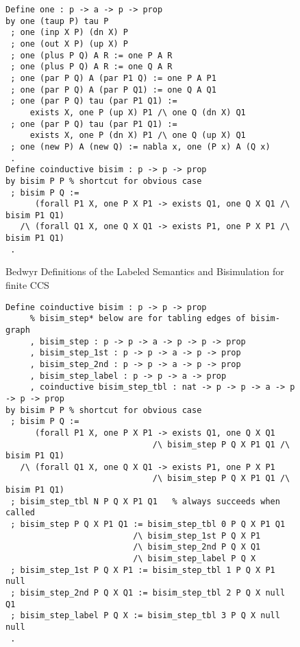 \documentclass{llncs}
\begin{document}
\begin{figure}
\begin{verbatim}
Define one : p -> a -> p -> prop
by one (taup P) tau P
 ; one (inp X P) (dn X) P
 ; one (out X P) (up X) P
 ; one (plus P Q) A R := one P A R
 ; one (plus P Q) A R := one Q A R
 ; one (par P Q) A (par P1 Q) := one P A P1
 ; one (par P Q) A (par P Q1) := one Q A Q1
 ; one (par P Q) tau (par P1 Q1) :=
     exists X, one P (up X) P1 /\ one Q (dn X) Q1
 ; one (par P Q) tau (par P1 Q1) :=
     exists X, one P (dn X) P1 /\ one Q (up X) Q1
 ; one (new P) A (new Q) := nabla x, one (P x) A (Q x)
 .
Define coinductive bisim : p -> p -> prop
by bisim P P % shortcut for obvious case
 ; bisim P Q :=
      (forall P1 X, one P X P1 -> exists Q1, one Q X Q1 /\ bisim P1 Q1)
   /\ (forall Q1 X, one Q X Q1 -> exists P1, one P X P1 /\ bisim P1 Q1)
 .
\end{verbatim}
\vspace*{-4ex}
\caption{Bedwyr Definitions of the Labeled Semantics and Bisimulation for finite CCS}
\label{fig:ccsone}
\end{figure}


\begin{figure}
\begin{verbatim}
Define coinductive bisim : p -> p -> prop
     % bisim_step* below are for tabling edges of bisim-graph
     , bisim_step : p -> p -> a -> p -> p -> prop
     , bisim_step_1st : p -> p -> a -> p -> prop
     , bisim_step_2nd : p -> p -> a -> p -> prop
     , bisim_step_label : p -> p -> a -> prop
     , coinductive bisim_step_tbl : nat -> p -> p -> a -> p -> p -> prop
by bisim P P % shortcut for obvious case
 ; bisim P Q :=
      (forall P1 X, one P X P1 -> exists Q1, one Q X Q1
                              /\ bisim_step P Q X P1 Q1 /\ bisim P1 Q1)
   /\ (forall Q1 X, one Q X Q1 -> exists P1, one P X P1
                              /\ bisim_step P Q X P1 Q1 /\ bisim P1 Q1)
 ; bisim_step_tbl N P Q X P1 Q1   % always succeeds when called
 ; bisim_step P Q X P1 Q1 := bisim_step_tbl 0 P Q X P1 Q1
                          /\ bisim_step_1st P Q X P1
                          /\ bisim_step_2nd P Q X Q1
                          /\ bisim_step_label P Q X
 ; bisim_step_1st P Q X P1 := bisim_step_tbl 1 P Q X P1 null
 ; bisim_step_2nd P Q X Q1 := bisim_step_tbl 2 P Q X null Q1
 ; bisim_step_label P Q X := bisim_step_tbl 3 P Q X null null
 .
\end{verbatim}
\label{fig:ccsbisim}
\end{figure}
\end{document}
